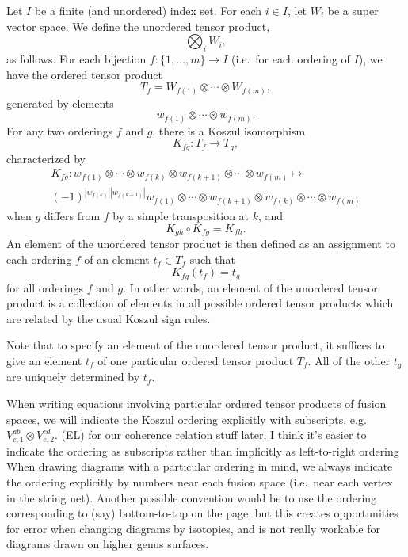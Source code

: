 \documentclass[12pt,a4paper]{article}
\newcommand{\tp}{\otimes}
\newcommand\be            {\begin{equation}}
\newcommand\ee            {\end{equation}}
\newcommand{\ethan}[1]{{\color{amethyst}\footnotesize{(EL) #1}}}
\begin{document}
Let $I$ be a finite (and unordered) index set.
For each $i\in I$, let $W_i$ be a super vector space.
We define the unordered tensor product,
\be
	\bigotimes_i W_i ,
\ee
as follows.
For each bijection $f: \{1, \ldots,m\} \to I$ (i.e.\ for each ordering of $I$),
we have the ordered tensor product
\be
	T_f = W_{f(1)}\otimes\cdots\otimes W_{f(m)} ,
\ee
generated by elements
\be
	w_{f(1)}\otimes\cdots\otimes w_{f(m)}.
\ee
For any two orderings $f$ and $g$, there is a Koszul isomorphism
\be
	K_{fg} : T_f \to T_g ,
\ee
characterized by
\begin{multline}
	K_{fg} : w_{f(1)}\otimes\cdots\otimes w_{f(k)} \otimes w_{f(k+1)} \otimes \cdots \otimes w_{f(m)} \mapsto \\
				(-1)^{|w_{f(k)}||w_{f(k+1)}|} w_{f(1)}\otimes\cdots\otimes w_{f(k+1)} \otimes w_{f(k)} \otimes \cdots \otimes w_{f(m)}
\end{multline}
when $g$ differs from $f$ by a simple transposition at $k$, and
\be
	K_{gh} \circ K_{fg} = K_{fh} .
\ee
An element of the unordered tensor product is then defined as an assignment to each ordering $f$ of an element $t_f\in T_f$
such that
\be
	K_{fg}(t_f) = t_g
\ee
for all orderings $f$ and $g$.
In other words, an element of the unordered tensor product is a collection of elements in all 
possible ordered tensor products which are related by the usual Koszul sign rules.

Note that to specify an element of the unordered tensor product, it suffices to give an element $t_f$ of one
particular ordered tensor product $T_f$.
All of the other $t_g$ are uniquely determined by $t_f$.

When writing equations involving particular ordered tensor products of fusion spaces, we will indicate the Koszul ordering 
explicitly with subscripts, e.g. $V^{ab}_{c,1} \tp V^{cd}_{e,2}$. \ethan{for our coherence relation stuff later, I think it's easier to indicate the ordering as subscripts rather than implicitly as left-to-right ordering}
When drawing diagrams with a particular ordering in mind, we always indicate the ordering explicitly by numbers near each fusion space (i.e.\ near
each vertex in the string net).
Another possible convention would be to use the ordering corresponding to (say) bottom-to-top on the page,
but this creates opportunities for error when changing diagrams by isotopies,
and is not really workable for diagrams drawn on higher genus surfaces.
\end{document}
